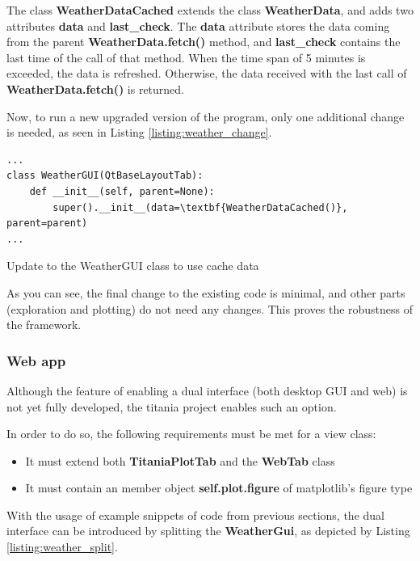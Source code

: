 The class \textbf{WeatherDataCached} extends the class \textbf{WeatherData}, and adds two attributes \textbf{data} and \textbf{last\_check}.
The  \textbf{data} attribute stores the data coming from the parent \textbf{WeatherData.fetch()} method, and  \textbf{last\_check} contains the last time of the call of that method.
When the time span of 5 minutes is exceeded, the data is refreshed. Otherwise, the data received with the last call of \textbf{WeatherData.fetch()} is returned.

Now, to run a new upgraded version of the program, only one additional change is needed, as seen in Listing \ref{listing:weather_change}.

\begin{listing}[!ht]
\begin{verbatim}
...
class WeatherGUI(QtBaseLayoutTab):
    def __init__(self, parent=None):
        super().__init__(data=\textbf{WeatherDataCached()}, parent=parent)
...

\end{verbatim}
\caption{Update to the WeatherGUI class to use cache data}
\label{listing:weather_change}
\end{listing}

As you can see, the final change to the existing code is minimal, and other parts (exploration and plotting) do not need any changes. This proves the robustness of the framework.

\subsubsection{Web app}
Although the feature of enabling a dual interface (both desktop GUI and web) is not yet fully developed, the titania project enables such an option.

In order to do so, the following requirements must be met for a view class:
\begin{itemize}
  \item It must extend both \textbf{TitaniaPlotTab} and the \textbf{WebTab} class
  \item It must contain an member object \textbf{self.plot.figure} of matplotlib's figure type
\end{itemize}

With the usage of example snippets of code from previous sections, the dual interface can be introduced by splitting the \textbf{WeatherGui}, as depicted by Listing \ref{listing:weather_split}.


